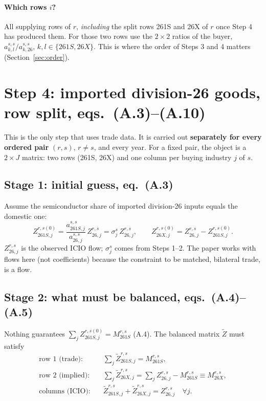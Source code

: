 \documentclass[11pt,a4paper]{article}
\theoremstyle{remark}
\theoremstyle{definition}
\newcommand{\sem}{{261S}}   %
\newcommand{\oth}{{26X}}    %
\newcommand{\agg}{{26}}     %
\newcommand{\tZ}{\tilde{Z}}
\begin{document}
\paragraph{Which rows $i$?} All supplying rows of $r$, \emph{including} the split rows \sem{} and \oth{} of $r$
once Step 4 has produced them. For those two rows use the $2\times2$ ratios of the buyer,
$a^{s,s}_{k,l}/a^{s,s}_{k,\agg}$, $k,l\in\{\sem,\oth\}$. This is where the order of Steps 3 and 4 matters
(Section~\ref{sec:order}).

\section{Step 4: imported division-26 goods, row split, eqs.~(A.3)--(A.10)}

This is the only step that uses trade data. It is carried out \textbf{separately for every ordered pair}
$(r,s)$, $r\neq s$, and every year. For a fixed pair, the object is a $2\times J$ matrix: two rows (\sem, \oth)
and one column per buying industry $j$ of $s$.

\subsection{Stage 1: initial guess, eq.~(A.3)}
Assume the semiconductor share of imported division-26 inputs equals the domestic one:
\begin{equation}
  Z^{r,s(0)}_{\sem,j} = \frac{a^{s,s}_{\sem,j}}{a^{s,s}_{\agg,j}}\,Z^{r,s}_{\agg,j} = \sigma^s_j\,Z^{r,s}_{\agg,j},
  \qquad
  Z^{r,s(0)}_{\oth,j} = Z^{r,s}_{\agg,j} - Z^{r,s(0)}_{\sem,j}. \tag{A.3}
\end{equation}
$Z^{r,s}_{\agg,j}$ is the observed ICIO flow; $\sigma^s_j$ comes from Steps 1--2. The paper works with flows here
(not coefficients) because the constraint to be matched, bilateral trade, is a flow.

\subsection{Stage 2: what must be balanced, eqs.~(A.4)--(A.5)}
Nothing guarantees $\sum_j Z^{r,s(0)}_{\sem,j} = M^{r,s}_\sem$ (A.4). The balanced matrix $\tZ$ must satisfy
\begin{align}
  \text{row 1 (trade):}\quad & \textstyle\sum_j \tZ^{r,s}_{\sem,j} = M^{r,s}_\sem, \label{eq:rowS}\\
  \text{row 2 (implied):}\quad & \textstyle\sum_j \tZ^{r,s}_{\oth,j} = \sum_j Z^{r,s}_{\agg,j} - M^{r,s}_\sem \equiv M^{r,s}_\oth, \label{eq:rowX}\\
  \text{columns (ICIO):}\quad & \tZ^{r,s}_{\sem,j} + \tZ^{r,s}_{\oth,j} = Z^{r,s}_{\agg,j}\quad\forall j. \label{eq:colj}
\end{align}
\end{document}
